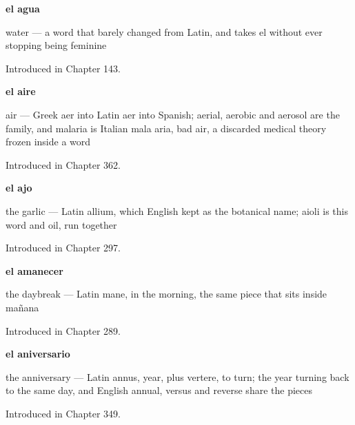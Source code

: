 \noindent\begin{minipage}[t]{\linewidth}
\raggedright
\textbf{el agua}\par
\small water — a word that barely changed from Latin, and takes el without ever stopping being feminine\par
\footnotesize Introduced in Chapter 143.
\end{minipage}\par\medskip

\noindent\begin{minipage}[t]{\linewidth}
\raggedright
\textbf{el aire}\par
\small air — Greek aer into Latin aer into Spanish; aerial, aerobic and aerosol are the family, and malaria is Italian mala aria, bad air, a discarded medical theory frozen inside a word\par
\footnotesize Introduced in Chapter 362.
\end{minipage}\par\medskip

\noindent\begin{minipage}[t]{\linewidth}
\raggedright
\textbf{el ajo}\par
\small the garlic — Latin allium, which English kept as the botanical name; aioli is this word and oil, run together\par
\footnotesize Introduced in Chapter 297.
\end{minipage}\par\medskip

\noindent\begin{minipage}[t]{\linewidth}
\raggedright
\textbf{el amanecer}\par
\small the daybreak — Latin mane, in the morning, the same piece that sits inside mañana\par
\footnotesize Introduced in Chapter 289.
\end{minipage}\par\medskip

\noindent\begin{minipage}[t]{\linewidth}
\raggedright
\textbf{el aniversario}\par
\small the anniversary — Latin annus, year, plus vertere, to turn; the year turning back to the same day, and English annual, versus and reverse share the pieces\par
\footnotesize Introduced in Chapter 349.
\end{minipage}\par\medskip


